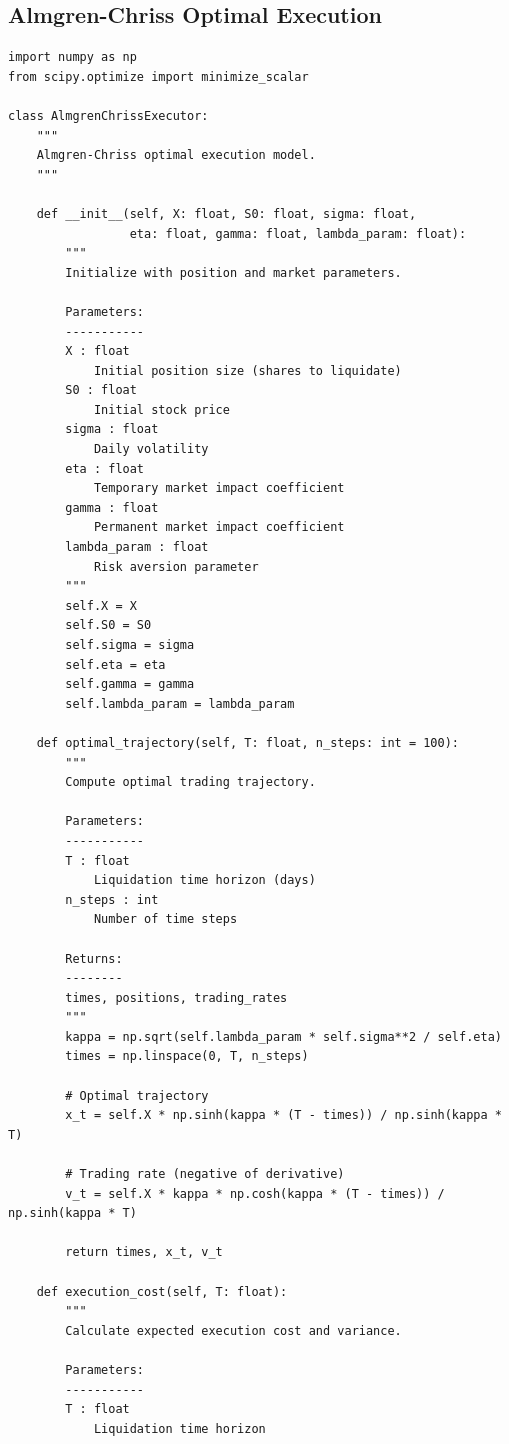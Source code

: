 \documentclass[11pt,a4paper]{article}
\begin{document}
\subsection{Almgren-Chriss Optimal Execution}

\begin{lstlisting}[caption=Almgren-Chriss Implementation]
import numpy as np
from scipy.optimize import minimize_scalar

class AlmgrenChrissExecutor:
    """
    Almgren-Chriss optimal execution model.
    """

    def __init__(self, X: float, S0: float, sigma: float,
                 eta: float, gamma: float, lambda_param: float):
        """
        Initialize with position and market parameters.

        Parameters:
        -----------
        X : float
            Initial position size (shares to liquidate)
        S0 : float
            Initial stock price
        sigma : float
            Daily volatility
        eta : float
            Temporary market impact coefficient
        gamma : float
            Permanent market impact coefficient
        lambda_param : float
            Risk aversion parameter
        """
        self.X = X
        self.S0 = S0
        self.sigma = sigma
        self.eta = eta
        self.gamma = gamma
        self.lambda_param = lambda_param

    def optimal_trajectory(self, T: float, n_steps: int = 100):
        """
        Compute optimal trading trajectory.

        Parameters:
        -----------
        T : float
            Liquidation time horizon (days)
        n_steps : int
            Number of time steps

        Returns:
        --------
        times, positions, trading_rates
        """
        kappa = np.sqrt(self.lambda_param * self.sigma**2 / self.eta)
        times = np.linspace(0, T, n_steps)

        # Optimal trajectory
        x_t = self.X * np.sinh(kappa * (T - times)) / np.sinh(kappa * T)

        # Trading rate (negative of derivative)
        v_t = self.X * kappa * np.cosh(kappa * (T - times)) / np.sinh(kappa * T)

        return times, x_t, v_t

    def execution_cost(self, T: float):
        """
        Calculate expected execution cost and variance.

        Parameters:
        -----------
        T : float
            Liquidation time horizon


\end{lstlisting}
\end{document}
